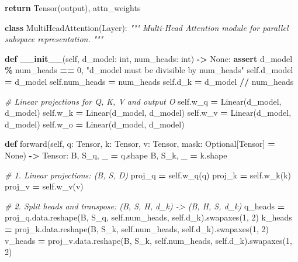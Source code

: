 \documentclass[
  letterpaper,
]{scrbook}
\newenvironment{Shaded}{\begin{snugshade}}{\end{snugshade}}
\newcommand{\BuiltInTok}[1]{#1}
\newcommand{\CommentTok}[1]{\textcolor[rgb]{0.56,0.35,0.01}{\textit{#1}}}
\newcommand{\ControlFlowTok}[1]{\textcolor[rgb]{0.13,0.29,0.53}{\textbf{#1}}}
\newcommand{\DecValTok}[1]{\textcolor[rgb]{0.00,0.00,0.81}{#1}}
\newcommand{\FunctionTok}[1]{\textcolor[rgb]{0.13,0.29,0.53}{\textbf{#1}}}
\newcommand{\KeywordTok}[1]{\textcolor[rgb]{0.13,0.29,0.53}{\textbf{#1}}}
\newcommand{\NormalTok}[1]{#1}
\newcommand{\OperatorTok}[1]{\textcolor[rgb]{0.81,0.36,0.00}{\textbf{#1}}}
\newcommand{\StringTok}[1]{\textcolor[rgb]{0.31,0.60,0.02}{#1}}
\newcommand{\VariableTok}[1]{\textcolor[rgb]{0.00,0.00,0.00}{#1}}
\begin{document}
\begin{Shaded}
\begin{Highlighting}[]
    \ControlFlowTok{return}\NormalTok{ Tensor(output), attn\_weights}


\KeywordTok{class}\NormalTok{ MultiHeadAttention(Layer):}
    \CommentTok{"""}
\CommentTok{    Multi{-}Head Attention module for parallel subspace representation.}
\CommentTok{    """}

    \KeywordTok{def} \FunctionTok{\_\_init\_\_}\NormalTok{(}\VariableTok{self}\NormalTok{, d\_model: }\BuiltInTok{int}\NormalTok{, num\_heads: }\BuiltInTok{int}\NormalTok{) }\OperatorTok{{-}\textgreater{}} \VariableTok{None}\NormalTok{:}
        \ControlFlowTok{assert}\NormalTok{ d\_model }\OperatorTok{\%}\NormalTok{ num\_heads }\OperatorTok{==} \DecValTok{0}\NormalTok{, }\StringTok{"d\_model must be divisible by num\_heads"}
        \VariableTok{self}\NormalTok{.d\_model }\OperatorTok{=}\NormalTok{ d\_model}
        \VariableTok{self}\NormalTok{.num\_heads }\OperatorTok{=}\NormalTok{ num\_heads}
        \VariableTok{self}\NormalTok{.d\_k }\OperatorTok{=}\NormalTok{ d\_model }\OperatorTok{//}\NormalTok{ num\_heads}

        \CommentTok{\# Linear projections for Q, K, V and output O}
        \VariableTok{self}\NormalTok{.w\_q }\OperatorTok{=}\NormalTok{ Linear(d\_model, d\_model)}
        \VariableTok{self}\NormalTok{.w\_k }\OperatorTok{=}\NormalTok{ Linear(d\_model, d\_model)}
        \VariableTok{self}\NormalTok{.w\_v }\OperatorTok{=}\NormalTok{ Linear(d\_model, d\_model)}
        \VariableTok{self}\NormalTok{.w\_o }\OperatorTok{=}\NormalTok{ Linear(d\_model, d\_model)}

    \KeywordTok{def}\NormalTok{ forward(}\VariableTok{self}\NormalTok{, q: Tensor, k: Tensor, v: Tensor, mask: Optional[Tensor] }\OperatorTok{=} \VariableTok{None}\NormalTok{) }\OperatorTok{{-}\textgreater{}}\NormalTok{ Tensor:}
\NormalTok{        B, S\_q, \_ }\OperatorTok{=}\NormalTok{ q.shape}
\NormalTok{        B, S\_k, \_ }\OperatorTok{=}\NormalTok{ k.shape}

        \CommentTok{\# 1. Linear projections: (B, S, D)}
\NormalTok{        proj\_q }\OperatorTok{=} \VariableTok{self}\NormalTok{.w\_q(q)}
\NormalTok{        proj\_k }\OperatorTok{=} \VariableTok{self}\NormalTok{.w\_k(k)}
\NormalTok{        proj\_v }\OperatorTok{=} \VariableTok{self}\NormalTok{.w\_v(v)}

        \CommentTok{\# 2. Split heads and transpose: (B, S, H, d\_k) {-}\textgreater{} (B, H, S, d\_k)}
\NormalTok{        q\_heads }\OperatorTok{=}\NormalTok{ proj\_q.data.reshape(B, S\_q, }\VariableTok{self}\NormalTok{.num\_heads, }\VariableTok{self}\NormalTok{.d\_k).swapaxes(}\DecValTok{1}\NormalTok{, }\DecValTok{2}\NormalTok{)}
\NormalTok{        k\_heads }\OperatorTok{=}\NormalTok{ proj\_k.data.reshape(B, S\_k, }\VariableTok{self}\NormalTok{.num\_heads, }\VariableTok{self}\NormalTok{.d\_k).swapaxes(}\DecValTok{1}\NormalTok{, }\DecValTok{2}\NormalTok{)}
\NormalTok{        v\_heads }\OperatorTok{=}\NormalTok{ proj\_v.data.reshape(B, S\_k, }\VariableTok{self}\NormalTok{.num\_heads, }\VariableTok{self}\NormalTok{.d\_k).swapaxes(}\DecValTok{1}\NormalTok{, }\DecValTok{2}\NormalTok{)}


\end{Highlighting}
\end{Shaded}
\end{document}
